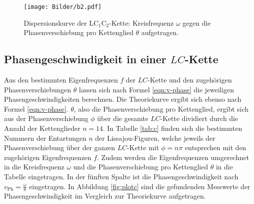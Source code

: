 \begin{figure}
	\centering
	\texttt{[image: Bilder/b2.pdf]}
	\caption{Dispersionskurve der LC$_1$C$_2$-Kette: Kreisfrequenz $\omega$ gegen die Phasenverschiebung pro Kettenglied $\theta$ aufgetragen.}
	\label{fig:dispicc}
\end{figure}



\FloatBarrier
\subsection{Phasengeschwindigkeit in einer $LC$-Kette}

Aus den bestimmten Eigenfrequenzen $f$ der $LC$-Kette und den zugehörigen Phasenverschiebungen $\theta$ lassen sich nach Formel \eqref{eqn:v-phase} die jeweiligen Phasengeschwindigkeiten berechnen.
Die Theoriekurve ergibt sich ebenso nach Formel \eqref{eqn:v-phase}.
$\theta$, also die Phasenverschiebung pro Kettenglied, ergibt sich aus der Phasenverschiebung $\phi$ über die gesamte $LC$-Kette dividiert durch die Anzahl der Kettenglieder $n=14$.
In Tabelle \ref{tab:c} finden sich die bestimmten Nummern der Entartungen $n$ der Lissajou-Figuren, welche jeweils der Phasenverschiebung über der ganzen $LC$-Kette mit $\phi=n\pi$ entsprechen mit den zugehörigen Eigenfrequenzen $f$.
Zudem werden die Eigenfrequenzen umgerechnet in die Kreisfrequenz $\omega$ und die Phasenverschiebung pro Kettenglied $\theta$ in die Tabelle eingetragen.
In der fünften Spalte ist die Phasengeschwindigkeit nach $v_{\mathrm{Ph}}=\frac{\omega}{\theta}$ eingetragen.
In Abbildung \ref{fig:plotc} sind die gefundenden Messwerte der Phasengeschwindigkeit im Vergleich zur Theoriekurve aufgetragen.
